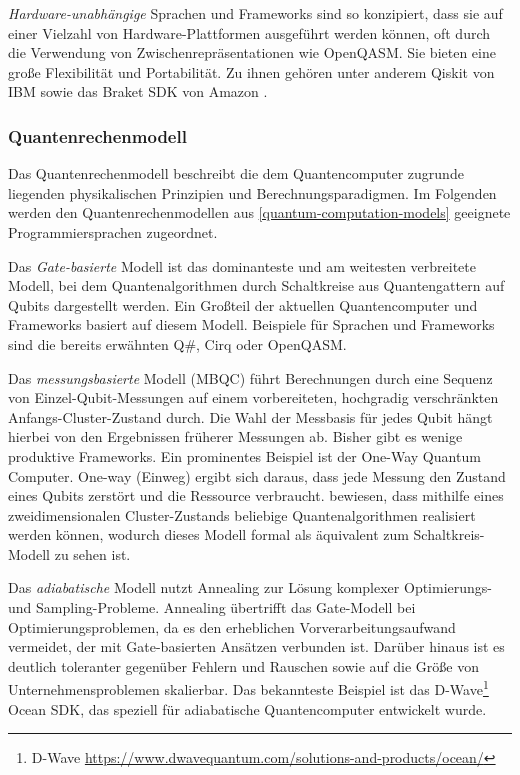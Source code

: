 \textit{Hardware-unabhängige} Sprachen und Frameworks sind so konzipiert, dass sie auf einer Vielzahl von Hardware-Plattformen ausgeführt werden können, oft durch die Verwendung von Zwischenrepräsentationen wie OpenQASM. Sie bieten eine große Flexibilität und Portabilität. Zu ihnen gehören unter anderem Qiskit von IBM sowie das Braket SDK von Amazon \autocite{ferreiraExploratoryStudyUsage2025}.

\subsubsection*{Quantenrechenmodell}

Das Quantenrechenmodell beschreibt die dem Quantencomputer zugrunde liegenden physikalischen Prinzipien und Berechnungsparadigmen. Im Folgenden werden den Quantenrechenmodellen aus \autoref{quantum-computation-models} geeignete Programmiersprachen zugeordnet.

Das \textit{Gate-basierte} Modell ist das dominanteste und am weitesten verbreitete Modell, bei dem Quantenalgorithmen durch Schaltkreise aus Quantengattern auf Qubits dargestellt werden. Ein Großteil der aktuellen Quantencomputer und Frameworks basiert auf diesem Modell. Beispiele für Sprachen und Frameworks sind die bereits erwähnten Q\#, Cirq oder OpenQASM. \autocite{ferreiraExploratoryStudyUsage2025}

Das \textit{messungsbasierte} Modell (MBQC) führt Berechnungen durch eine Sequenz von Einzel-Qubit-Messungen auf einem vorbereiteten, hochgradig verschränkten Anfangs-Cluster-Zustand durch. Die Wahl der Messbasis für jedes Qubit hängt hierbei von den Ergebnissen früherer Messungen ab. Bisher gibt es wenige produktive Frameworks. Ein prominentes Beispiel ist der One-Way Quantum Computer. One-way (Einweg) ergibt sich daraus, dass jede Messung den Zustand eines Qubits zerstört und die Ressource verbraucht. \citeauthor{briegelMeasurementbasedQuantumComputation2009} bewiesen, dass mithilfe eines zweidimensionalen Cluster-Zustands beliebige Quantenalgorithmen realisiert werden können, wodurch dieses Modell formal als äquivalent zum Schaltkreis-Modell zu sehen ist. \autocite{briegelMeasurementbasedQuantumComputation2009}

Das \textit{adiabatische} Modell nutzt Annealing zur Lösung komplexer Optimierungs- und Sampling-Probleme. Annealing übertrifft das Gate-Modell bei Optimierungsproblemen, da es den erheblichen Vorverarbeitungsaufwand vermeidet, der mit Gate-basierten Ansätzen verbunden ist. Darüber hinaus ist es deutlich toleranter gegenüber Fehlern und Rauschen sowie auf die Größe von Unternehmensproblemen skalierbar. \autocite{albash_adiabatic_2018} Das bekannteste Beispiel ist das D-Wave\footnote{D-Wave \url{https://www.dwavequantum.com/solutions-and-products/ocean/}} Ocean SDK, das speziell für adiabatische Quantencomputer entwickelt wurde.

